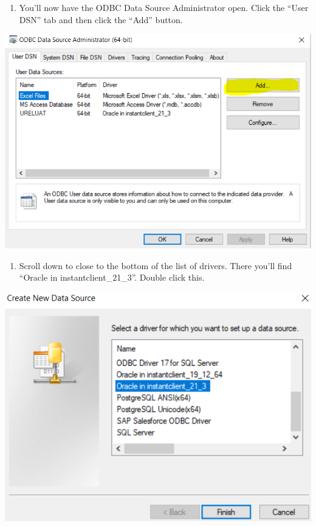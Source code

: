 \documentclass[]{book}
\providecommand{\tightlist}{%
  \setlength{\itemsep}{0pt}\setlength{\parskip}{0pt}}
\begin{document}
\begin{enumerate}
\def\labelenumi{\arabic{enumi})}
\setcounter{enumi}{1}
\tightlist
\item
  You'll now have the ODBC Data Source Administrator open. Click the ``User DSN'' tab and then click the ``Add'' button.
\end{enumerate}

\includegraphics[width=8.26in]{images/odbc}

\begin{enumerate}
\def\labelenumi{\arabic{enumi})}
\setcounter{enumi}{2}
\tightlist
\item
  Scroll down to close to the bottom of the list of drivers. There you'll find ``Oracle in instantclient_21_3''. Double click this.
\end{enumerate}

\includegraphics[width=6.5in]{images/oracle}
\end{document}
